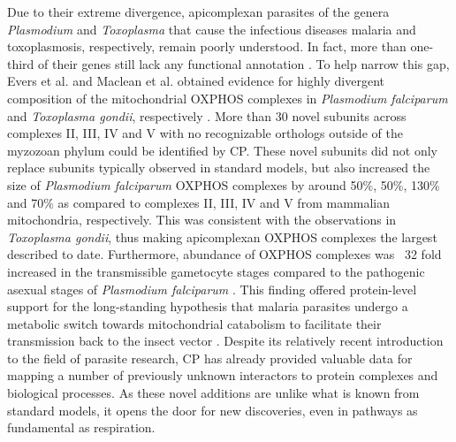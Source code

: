 Due to their extreme divergence, apicomplexan parasites of the genera \emph{Plasmodium} and \emph{Toxoplasma} that cause the infectious diseases malaria and toxoplasmosis, respectively, remain poorly understood. In fact, more than one-third of their genes still lack any functional annotation \cite{Aurrecoechea_2009, Harb_2020}. To help narrow this gap, Evers et al. and Maclean et al. obtained evidence for highly divergent composition of the mitochondrial OXPHOS complexes in \emph{Plasmodium falciparum} and \emph{Toxoplasma gondii}, respectively \cite{Evers_2021, Maclean_2021}. More than 30 novel subunits across complexes II, III, IV and V with no recognizable orthologs outside of the myzozoan phylum could be identified by CP. These novel subunits did not only replace subunits typically observed in standard models, but also increased the size of \emph{Plasmodium falciparum} OXPHOS complexes by around 50\%, 50\%, 130\% and 70\% as compared to complexes II, III, IV and V from mammalian mitochondria, respectively. This was consistent with the observations in \emph{Toxoplasma gondii}, thus making apicomplexan OXPHOS complexes the largest described to date. Furthermore, abundance of OXPHOS complexes was ~32 fold increased in the transmissible gametocyte stages compared to the pathogenic asexual stages of \emph{Plasmodium falciparum} \cite{Evers_2021}. This finding offered protein-level support for the long-standing hypothesis that malaria parasites undergo a metabolic switch towards mitochondrial catabolism to facilitate their transmission back to the insect vector \cite{MacRae_2013}. Despite its relatively recent introduction to the field of parasite research, CP has already provided valuable data for mapping a number of previously unknown interactors to protein complexes and biological processes. As these novel additions are unlike what is known from standard models, it opens the door for new discoveries, even in pathways as fundamental as respiration.

